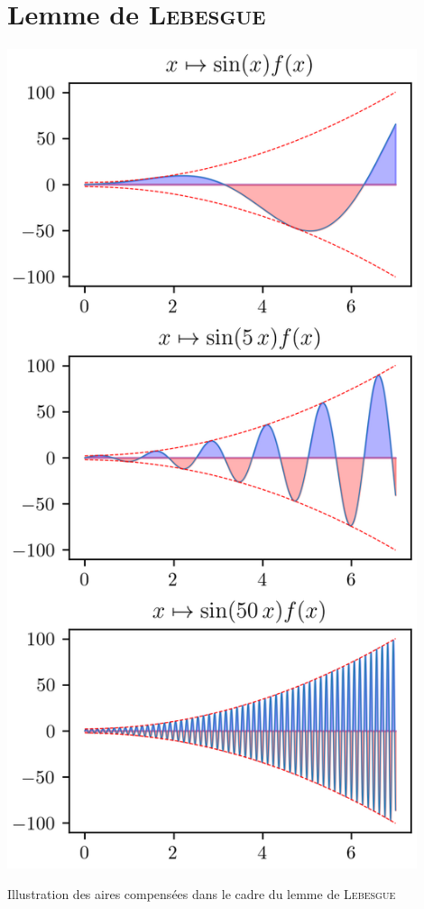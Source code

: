 \section{Lemme de \textsc{Lebesgue}}\label{sec:lemmeLebesgue}

\begin{marginfigure}[-2cm]
    \includegraphics[width=0.9\textwidth]{illustrations/integration-02_lebesgue.png}
    \caption{Illustration des aires compensées dans le cadre du lemme de \textsc{Lebesgue} }
\end{marginfigure}
